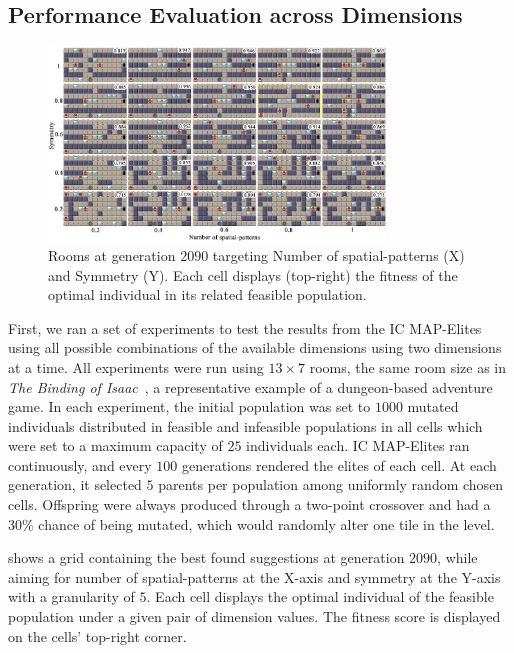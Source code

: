 \subsection{Performance Evaluation across Dimensions}

\begin{figure}[h]
\centerline{\includegraphics[width=0.8\textwidth]{figures/figure3.png}}
\caption{Rooms at generation $2090$ targeting Number of spatial-patterns (X) and Symmetry (Y). Each cell displays (top-right) the fitness of the optimal individual in its related feasible population. }
\label{figs:patt_sym}
\end{figure}

First, we ran a set of experiments to test the results from the IC MAP-Elites using all possible combinations of the available dimensions using two dimensions at a time. All experiments were run using $13\times7$ rooms, the same room size as in \emph{The Binding of Isaac}~, a representative example of a dungeon-based adventure game. In each experiment, the initial population was set to $1000$ mutated individuals distributed in feasible and infeasible populations in all cells which were set to a maximum capacity of $25$ individuals each. IC MAP-Elites ran continuously, and every $100$ generations rendered the elites of each cell. At each generation, it selected $5$ parents per population among uniformly random chosen cells. Offspring were always produced through a two-point crossover and had a 30\% chance of being mutated, which would randomly alter one tile in the level.

 shows a grid containing the best found suggestions at generation $2090$, while aiming for number of spatial-patterns at the X-axis and symmetry at the Y-axis with a granularity of $5$. Each cell displays the optimal individual of the feasible population under a given pair of dimension values. The fitness score is displayed on the cells' top-right corner.

